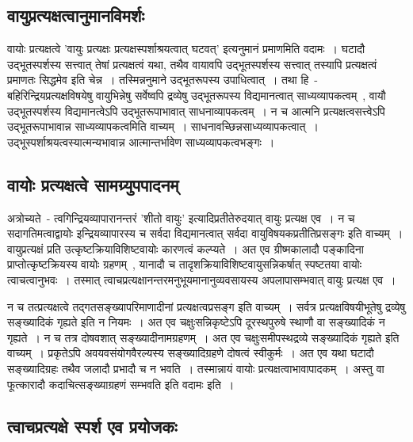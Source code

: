 		\subsection{वायुप्रत्यक्षत्वानुमानविमर्शः}

		वायोः प्रत्यक्षत्वे 'वायुः प्रत्यक्षः प्रत्यक्षस्पर्शाश्रयत्वात् घटवत्' इत्यनुमानं प्रमाणमिति वदामः~। घटादौ उद्भूतस्पर्शस्य सत्त्वात् तेषां प्रत्यक्षत्वं यथा, तथैव वायावपि उद्भूतस्पर्शस्य सत्त्वात् तस्यापि प्रत्यक्षत्वं प्रमाणतः सिद्धमेव इति चेन्न~। तस्मिन्ननुमाने उद्भूतरूपस्य उपाधित्वात्~। तथा हि~- बहिरिन्द्रियप्रत्यक्षविषयेषु वायुभिन्नेषु सर्वेष्वपि द्रव्येषु उद्भूतरूपस्य विद्यमानत्वात् साध्यव्यापकत्वम्~, वायौ उद्भूतस्पर्शस्य विद्यमानत्वेऽपि उद्भूतरूपाभावात् साधनाव्यापकत्वम्~। न च आत्मनि प्रत्यक्षत्वसत्त्वेऽपि उद्भूतरूपाभावान्न साध्यव्यापकत्वमिति वाच्यम्~। साधनावच्छिन्नसाध्यव्यापकत्वात्~। उद्भूस्पर्शाश्रयत्वस्यात्मन्यभावान्न आत्मान्तर्भावेण साध्यव्यापकत्वभङ्गः~।

		\subsection{वायोः प्रत्यक्षत्वे सामग्र्युपपादनम्}

		अत्रोच्यते~- त्वगिन्द्रियव्यापारानन्तरं 'शीतो वायुः' इत्यादिप्रतीतेरुदयात् वायुः प्रत्यक्ष एव~। न च सदागतिमत्वाद्वायोः इन्द्रियव्यापारस्य च सर्वदा विद्यमानत्वात् सर्वदा वायुविषयकप्रतीतिप्रसङ्गः इति वाच्यम्~। वायुप्रत्यक्षं प्रति उत्कृष्टक्रियाविशिष्टवायोः कारणत्वं कल्प्यते~। अत एव ग्रीष्मकालादौ पङ्कादिना प्राप्तोत्कृष्टक्रियस्य वायोः ग्रहणम्~, यानादौ च तादृशक्रियाविशिष्टवायुसन्निकर्षात् स्पष्टतया वायोः त्वाचत्वानुभवः~। तस्मात् त्वाचप्रत्यक्षानन्तरमनुभूयमानानुव्यवसायस्य अपलापासम्भवात् वायुः प्रत्यक्ष एव~।

		न च तत्प्रत्यक्षत्वे तद्गतसङ्ख्यापरिमाणादीनां प्रत्यक्षत्वप्रसङ्ग इति वाच्यम्~। सर्वत्र प्रत्यक्षविषयीभूतेषु द्रव्येषु सङ्ख्यादिकं गृह्यते इति न नियमः~। अत एव चक्षुःसन्निकृष्टेऽपि दूरस्थपुरुषे स्थाणौ वा सङ्ख्यादिकं न गृह्यते~। न च तत्र दोषवशात् सङ्ख्यादीनामग्रहणम्~। अत एव चक्षुःसमीपस्थद्रव्ये सङ्ख्यादिकं गृह्यते इति वाच्यम्~। प्रकृतेऽपि अवयवसंयोगवैरल्यस्य सङ्ख्यादिग्रहणे दोषत्वं स्वीकुर्मः‌~। अत एव यथा घटादौ सङ्ख्यादिग्रहः तथैव जलादौ प्रभादौ च न भवति~। तस्मान्नायं वायोः प्रत्यक्षत्वाभावापादकम्~। अस्तु वा फूत्कारादौ कदाचित्सङ्ख्याग्रहणं सम्भवति इति वदामः इति~।

		\subsection{त्वाचप्रत्यक्षे स्पर्श एव प्रयोजकः}

